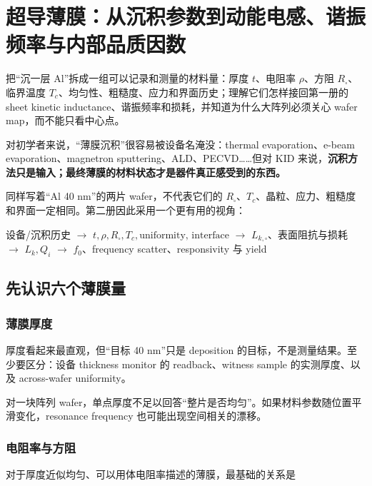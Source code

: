 \chapter{超导薄膜：从沉积参数到动能电感、谐振频率与内部品质因数}

\begin{chaptergoal}
把“沉一层 Al”拆成一组可以记录和测量的材料量：厚度 $t$、电阻率 $\rho$、方阻 $R_\square$、临界温度 $T_c$、均匀性、粗糙度、应力和界面历史；理解它们怎样接回第一册的 sheet kinetic inductance、谐振频率和损耗，并知道为什么大阵列必须关心 wafer map，而不能只看中心点。
\end{chaptergoal}

对初学者来说，“薄膜沉积”很容易被设备名淹没：thermal evaporation、e-beam evaporation、magnetron sputtering、ALD、PECVD……但对 KID 来说，\textbf{沉积方法只是输入；最终薄膜的材料状态才是器件真正感受到的东西。}

同样写着“Al 40 nm”的两片 wafer，不代表它们的 $R_\square$、$T_c$、晶粒、应力、粗糙度和界面一定相同。第二册因此采用一个更有用的视角：

\begin{processbox}
设备/沉积历史
$\rightarrow$
$t,\rho,R_\square,T_c,\text{uniformity, interface}$
$\rightarrow$
$L_{k,\square}$、表面阻抗与损耗
$\rightarrow$
$L_k,Q_i$
$\rightarrow$
$f_0$、frequency scatter、responsivity 与 yield
\end{processbox}

\section{先认识六个薄膜量}

\subsection{薄膜厚度}

厚度看起来最直观，但“目标 40 nm”只是 deposition 的目标，不是测量结果。至少要区分：设备 thickness monitor 的 readback、witness sample 的实测厚度、以及 across-wafer uniformity。

对一块阵列 wafer，单点厚度不足以回答“整片是否均匀”。如果材料参数随位置平滑变化，resonance frequency 也可能出现空间相关的漂移。

\subsection{电阻率与方阻}

对于厚度近似均匀、可以用体电阻率描述的薄膜，最基础的关系是


